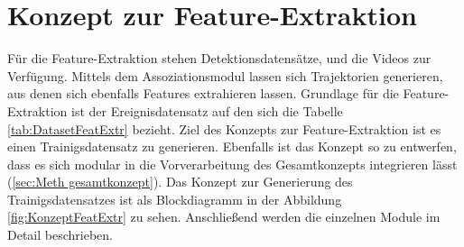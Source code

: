 \section{Konzept zur Feature-Extraktion} \label{sec:Meth FeatExtr}
Für die Feature-Extraktion stehen Detektionsdatensätze, und die Videos zur Verfügung. Mittels dem Assoziationsmodul lassen sich Trajektorien generieren, aus denen sich ebenfalls Features extrahieren lassen. Grundlage für die Feature-Extraktion ist der Ereignisdatensatz auf den sich die Tabelle \ref{tab:DatasetFeatExtr} bezieht. Ziel des Konzepts zur Feature-Extraktion ist es einen Trainigsdatensatz zu generieren. Ebenfalls ist das Konzept so zu entwerfen, dass es sich modular in die Vorverarbeitung des Gesamtkonzepts integrieren lässt (\ref{sec:Meth gesamtkonzept}). Das Konzept zur Generierung des Trainigsdatensatzes ist als Blockdiagramm in der Abbildung \ref{fig:KonzeptFeatExtr} zu sehen. Anschließend werden die einzelnen Module im Detail beschrieben.


